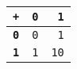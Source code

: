 \begin{tabular}{rrr}
\toprule
\textbf{\texttt{+}}& \textbf{\texttt{0}}& \textbf{\texttt{1}}\\ \midrule
\textbf{\texttt{0}} & \texttt{0} & \texttt{1}\\
\textbf{\texttt{1}} & \texttt{1} & \texttt{10}\\
\bottomrule
\end{tabular}
